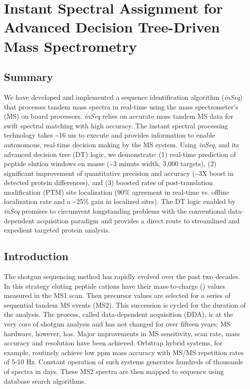 \chapter{Instant Spectral Assignment for Advanced Decision Tree-Driven Mass Spectrometry}

\def\inseq{\textit{inSeq}}

\section{Summary}
We have developed and implemented a sequence identification algorithm (\inseq{}) that processes tandem mass spectra in real-time using the mass spectrometer's (MS) on board processors. \inseq{} relies on accurate mass tandem MS data for swift spectral matching with high accuracy. The instant spectral processing technology takes \textasciitilde16 ms to execute and provides information to enable autonomous, real-time decision making by the MS system. Using \inseq{}, and its advanced decision tree (DT) logic, we demonstrate: (1) real-time prediction of peptide elution windows en masse (\textasciitilde3 minute width, 3,000 targets), (2) significant improvement of quantitative precision and accuracy (\textasciitilde3X boost in detected protein differences), and (3) boosted rates of post-translation modification (PTM) site localization (90\% agreement in real-time vs. offline localization rate and a \textasciitilde25\% gain in localized sites). The DT logic enabled by \inseq{} promises to circumvent longstanding problems with the conventional data-dependent acquisition paradigm and provides a direct route to streamlined and expedient targeted protein analysis.

\section{Introduction}
The shotgun sequencing method has rapidly evolved over the past two decades.\cite{mudpit, bigtime} In this strategy eluting peptide cations have their mass-to-charge (\mz{}) values measured in the MS1 scan. Then precursor \mz{} values are selected for a series of sequential tandem MS events (MS2). This succession is cycled for the duration of the analysis. The process, called data-dependent acquisition (DDA), is at the very core of shotgun analysis and has not changed for over fifteen years; MS hardware, however, has. Major improvements in MS sensitivity, scan rate, mass accuracy and resolution have been achieved. Orbitrap hybrid systems, for example, routinely achieve low ppm mass accuracy with MS/MS repetition rates of 5-10 Hz.\cite{subppm,qexactive} Constant operation of such systems generates hundreds of thousands of spectra in days. These MS2 spectra are then mapped to sequence using database search algorithms.\cite{sequest,mascot,omssa}

